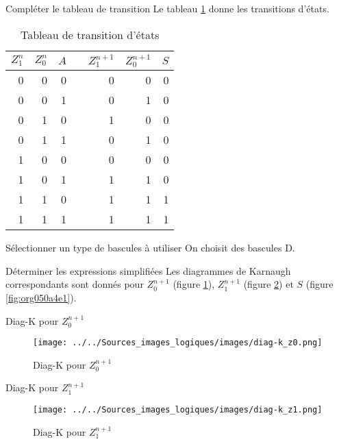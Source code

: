 \documentclass[presentation]{beamer}
\begin{document}
\begin{frame}[label={sec:org4ce1c2b}]{Compléter le tableau de transition}
Le tableau \ref{tab:orgf8841be} donne les transitions d'états. 

\begin{table}[htbp]
\caption{\label{tab:orgf8841be}Tableau de transition d'états}
\centering
\begin{tabular}{rrrlrrr}
\(Z_1^n\) & \(Z_0^n\) & \(A\) &  & \(Z_1^{n+1}\) & \(Z_0^{n+1}\) & \(S\)\\
\hline
0 & 0 & 0 &  & 0 & 0 & 0\\
0 & 0 & 1 &  & 0 & 1 & 0\\
0 & 1 & 0 &  & 1 & 0 & 0\\
0 & 1 & 1 &  & 0 & 1 & 0\\
1 & 0 & 0 &  & 0 & 0 & 0\\
1 & 0 & 1 &  & 1 & 1 & 0\\
1 & 1 & 0 &  & 1 & 1 & 1\\
1 & 1 & 1 &  & 1 & 1 & 1\\
\end{tabular}
\end{table}
\end{frame}


\begin{frame}[label={sec:org235d7ee}]{Sélectionner un type de bascules à utiliser}
On choisit des bascules D. 
\end{frame}

\begin{frame}[label={sec:org192bdd8}]{Déterminer les expressions simplifiées}
Les diagrammes de Karnaugh correspondants sont donnés pour
\(Z_0^{n+1}\) (figure \ref{fig:orga552cbe}), \(Z_1^{n+1}\) (figure
\ref{fig:orgf6d6b1a}) et \(S\) (figure \ref{fig:org050a4e1}).
\end{frame}

\begin{frame}[label={sec:orgdf72748}]{Diag-K pour \(Z_0^{n+1}\)}
\begin{figure}[htbp]
\centering
\texttt{[image: ../../Sources\_images\_logiques/images/diag-k\_z0.png]}
\caption{\label{fig:orga552cbe}Diag-K pour \(Z_0^{n+1}\)}
\end{figure}
\end{frame}

\begin{frame}[label={sec:orgaf4e425}]{Diag-K pour \(Z_1^{n+1}\)}
\begin{figure}[htbp]
\centering
\texttt{[image: ../../Sources\_images\_logiques/images/diag-k\_z1.png]}
\caption{\label{fig:orgf6d6b1a}Diag-K pour \(Z_1^{n+1}\)}
\end{figure}
\end{frame}
\end{document}
